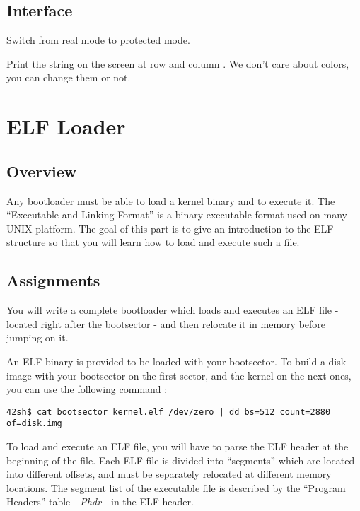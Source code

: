 \subsection*{Interface}
{
  Switch from real mode to protected mode.
}

{
  Print the string  on the screen at row 
  and column . We don't care about colors, you can change them
  or not.
}

%
%

\newpage

\section{ELF Loader}

\subsection*{Overview}
Any bootloader must be able to load a kernel binary and to execute it.
The ``Executable and Linking Format'' is a binary executable format used on
many UNIX platform. The goal of this part is to give an introduction to the
ELF structure so that you will learn how to load and execute such a file.

\subsection*{Assignments}
You will write a complete bootloader which loads and executes an ELF file
- located right after the bootsector - and then relocate it in memory
before jumping on it.

An ELF binary is provided to be loaded with your bootsector. To build
a disk image with your bootsector on the first sector, and the kernel on the
next ones, you can use the following command :

\begin{verbatim}
42sh$ cat bootsector kernel.elf /dev/zero | dd bs=512 count=2880 of=disk.img
\end{verbatim}

To load and execute an ELF file, you will have to parse the ELF header at the
beginning of the file. Each ELF file is divided into ``segments'' which are
located into different offsets, and must be separately relocated at different
memory locations. The segment list of the executable file is described by the
``Program Headers'' table - \emph{Phdr} - in the ELF header.


